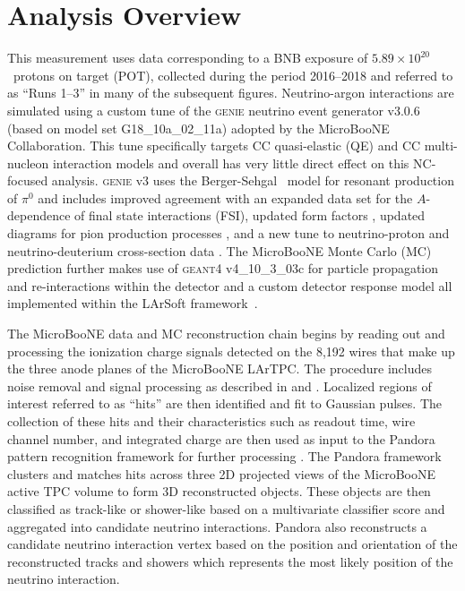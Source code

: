 \section{Analysis Overview}

This measurement uses data corresponding to a BNB exposure of $5.89\times10^{20}$~protons on target (POT), collected during the period 2016--2018 and referred to as ``Runs 1--3'' in many of the subsequent figures. Neutrino-argon interactions are simulated using a custom tune \cite{MicroBooNE:2021ccs} of the \textsc{genie} neutrino event generator v3.0.6 \cite{Andreopoulos:2009rq,GENIE:2021zuu} (based on model set  G18\_10a\_02\_11a) adopted by the MicroBooNE Collaboration. This tune specifically targets CC quasi-elastic (QE) and CC multi-nucleon interaction models and overall has very little direct effect on this NC-focused analysis. \textsc{genie} v3 uses the Berger-Sehgal~\cite{Rein:1980wg,Berger:2007rq} model for resonant production of $\pi^0$ and includes improved agreement with an expanded data set for the $A$-dependence of final state interactions (FSI), updated form factors \cite{Graczyk:2008}, updated diagrams for pion production processes \cite{Berger:2007rq,Kuzmin:2004,Nowak:2009}, and a new tune to neutrino-proton and neutrino-deuterium cross-section data \cite{GENIE:2021zuu}. The MicroBooNE Monte Carlo (MC) prediction further makes use of \textsc{geant4} v4\_10\_3\_03c \cite{GEANT4:2002zbu} for particle propagation and re-interactions within the detector and a custom detector response model all implemented within the LArSoft framework~\cite{Snider_2017}. 

The MicroBooNE data and MC reconstruction chain begins by reading out and processing the ionization charge signals detected on the 8,192 wires that make up the three anode planes of the MicroBooNE LArTPC. The procedure includes noise removal \cite{MicroBooNE:2017qiu} and signal processing as described in \cite{MicroBooNE:2018swd} and \cite{MicroBooNE:2018vro}. Localized regions of interest referred to as ``hits'' are then identified and fit to Gaussian pulses. The collection of these hits and their characteristics such as readout time, wire channel number, and integrated charge are then used as input to the Pandora pattern recognition framework for further processing \cite{Marshall:2015rfa}. The Pandora framework clusters and matches hits across three 2D projected views of the MicroBooNE active TPC volume to form 3D reconstructed objects. These objects are then classified as track-like or shower-like based on a multivariate classifier score and aggregated into candidate neutrino interactions. Pandora also reconstructs a candidate neutrino interaction vertex based on the position and orientation of the reconstructed tracks and showers which represents the most likely position of the neutrino interaction.

